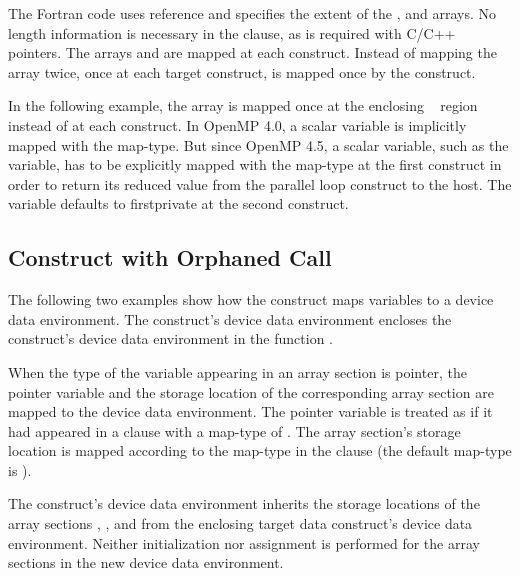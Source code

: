 

The Fortran code uses reference and specifies the extent of the ,  and  arrays. 
No length information is necessary in the  clause, as is required with 
C/C++ pointers. The arrays  and  are mapped at each  construct. 
Instead of mapping the array  twice, once at each target construct,  is mapped 
once by the   construct.


In the following example, the array  is mapped once at the enclosing 
~ region instead of at each  construct. 
In OpenMP 4.0, a scalar variable is implicitly mapped with the  map-type.
But since OpenMP 4.5, a scalar variable, such as the  variable, has to be explicitly mapped with 
the  map-type at the first  construct in order to return 
its reduced value from the parallel loop construct to the host.
The variable defaults to firstprivate at the second  construct.



\subsection{  Construct with Orphaned Call}

The following two examples show how the   construct 
maps variables to a device data environment. The   
construct's device data environment encloses the  construct's device 
data environment in the function .

When the type of the variable appearing in an array section is pointer, the pointer 
variable and the storage location of the corresponding array section are mapped 
to the device data environment. The pointer variable is treated as if it had appeared 
in a  clause with a map-type of . The array section's 
storage location is mapped according to the map-type in the  clause 
(the default map-type is ).

The  construct's device data environment inherits the storage locations 
of the array sections , , and  from the enclosing target data 
construct's device data environment. Neither initialization nor assignment is performed 
for the array sections in the new device data environment.

